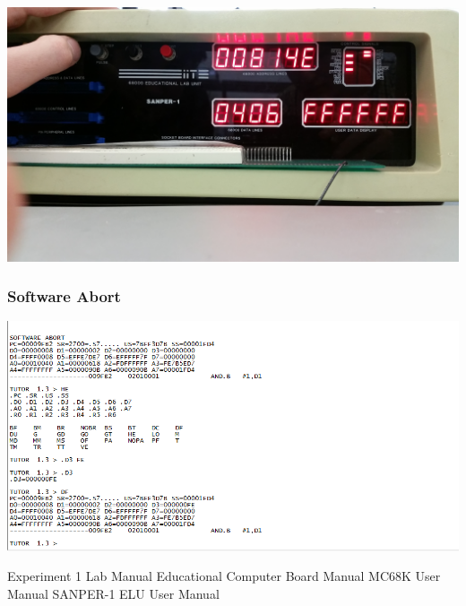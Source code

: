 \documentclass[12pt, twocolumn]{article}
\begin{document}
\begin{center}
\includegraphics[width=1\linewidth]{Lab1/20150120_095016}
\end{center}
\subsubsection{Software Abort}
\label{abort}
\begin{center}
\includegraphics[width=2\linewidth]{Lab1/ABORT1}
\end{center}

\begin{thebibliography}{1}
 Experiment 1 Lab Manual
 Educational Computer Board Manual
MC68K User Manual
SANPER-1 ELU User Manual


\end{thebibliography}
\end{document}

